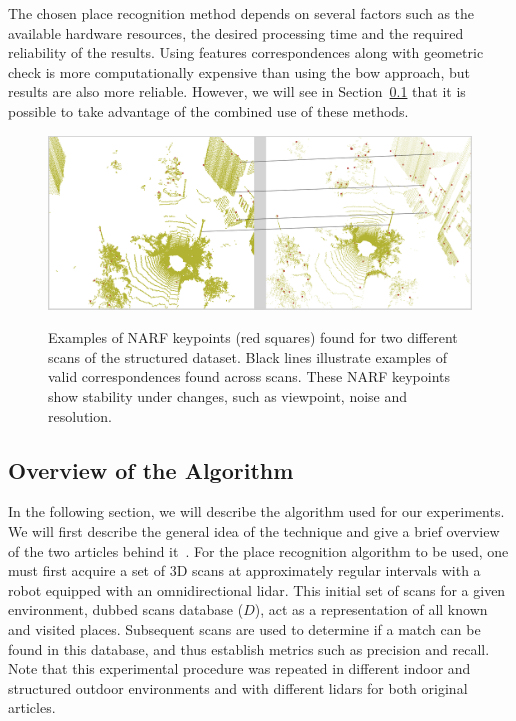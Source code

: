The chosen place recognition method depends on several factors such as the available hardware resources, the desired processing time and the required reliability of the results. Using features correspondences along with geometric check is more computationally expensive than using the \gls*{bow} approach, but results are also more reliable. However, we will see in Section~\ref{ssec:chap_slam_algo} that it is possible to take advantage of the combined use of these methods.

\begin{figure}
    \centering
    \includegraphics[width=0.995\linewidth]{img/chap_slam/features_line.png}\\
    \caption[Examples of NARF keypoints found for two different scans with examples of correspondences.]{Examples of NARF keypoints (red squares) found for two different scans of the structured dataset. Black lines illustrate examples of valid correspondences found across scans. These NARF keypoints show stability under changes, such as viewpoint, noise and resolution.}
    \label{fig:chap_slam_features_correspondences}
\end{figure}


\subsection{Overview of the Algorithm}
\label{ssec:chap_slam_algo}

In the following section, we will describe the algorithm used for our experiments. We will first describe the general idea of the technique and give a brief overview of the two articles behind it~\citep{Steder2010, Steder2011b}. For the place recognition algorithm to be used, one must first acquire a set of 3D scans at approximately regular intervals with a robot equipped with an omnidirectional \gls*{lidar}. This initial set of scans for a given environment, dubbed scans database ($D$), act as a representation of all known and visited places. Subsequent scans are used to determine if a match can be found in this database, and thus establish metrics such as precision and recall. Note that this experimental procedure was repeated in different indoor and structured outdoor environments and with different \gls*{lidar}s for both original articles.

